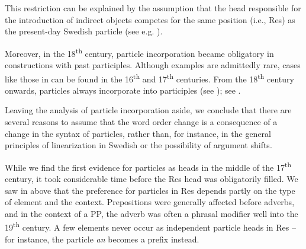 \documentclass[output=paper]{langscibook}
\begin{document}
This restriction can be explained by the assumption that the head responsible for the introduction of indirect objects competes for the same position (i.e., Res) as the present-day Swedish particle (see e.g. \citealt{Ramchand2008}).



Moreover, in the 18\textsuperscript{th} century, particle incorporation became obligatory in constructions with past participles. Although examples are admittedly rare, cases like those in  can be found in the 16\textsuperscript{th} and 17\textsuperscript{th} centuries. From the 18\textsuperscript{th} century onwards, particles always incorporate into participles (see \citealt{Lundquist2014Passives}); see .


\ea\label{ex:lalu:61}

\z
\ex\label{ex:lalu:62}
\z
\z


Leaving the analysis of particle incorporation aside, we conclude that there are several reasons to assume that the word order change is a consequence of a change in the syntax of particles, rather than, for instance, in the general principles of linearization in Swedish or the possibility of argument shifts. 



While we find the first evidence for particles as heads in the middle of the 17\textsuperscript{th} century, it took considerable time before the Res head was obligatorily filled. We saw in  above that the preference for particles in Res depends partly on the type of element and the context. Prepositions were generally affected before adverbs, and in the context of a PP, the adverb was often a phrasal modifier well into the 19\textsuperscript{th} century. A few elements never occur as independent particle heads in Res – for instance, the particle \textit{an} becomes a prefix instead.
\end{document}
